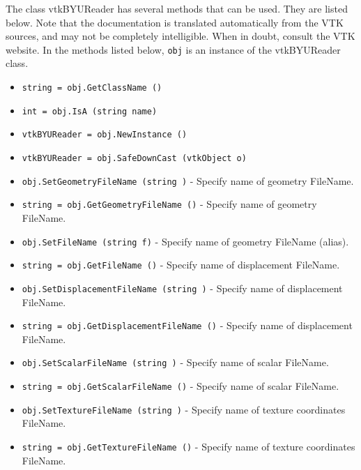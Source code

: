 The class vtkBYUReader has several methods that can be used.
  They are listed below.
Note that the documentation is translated automatically from the VTK sources,
and may not be completely intelligible.  When in doubt, consult the VTK website.
In the methods listed below, \verb|obj| is an instance of the vtkBYUReader class.
\begin{itemize}
\item  \verb|string = obj.GetClassName ()|

\item  \verb|int = obj.IsA (string name)|

\item  \verb|vtkBYUReader = obj.NewInstance ()|

\item  \verb|vtkBYUReader = obj.SafeDownCast (vtkObject o)|

\item  \verb|obj.SetGeometryFileName (string )| -  Specify name of geometry FileName.

\item  \verb|string = obj.GetGeometryFileName ()| -  Specify name of geometry FileName.

\item  \verb|obj.SetFileName (string f)| -  Specify name of geometry FileName (alias).

\item  \verb|string = obj.GetFileName ()| -  Specify name of displacement FileName.

\item  \verb|obj.SetDisplacementFileName (string )| -  Specify name of displacement FileName.

\item  \verb|string = obj.GetDisplacementFileName ()| -  Specify name of displacement FileName.

\item  \verb|obj.SetScalarFileName (string )| -  Specify name of scalar FileName.

\item  \verb|string = obj.GetScalarFileName ()| -  Specify name of scalar FileName.

\item  \verb|obj.SetTextureFileName (string )| -  Specify name of texture coordinates FileName.

\item  \verb|string = obj.GetTextureFileName ()| -  Specify name of texture coordinates FileName.


\end{itemize}

